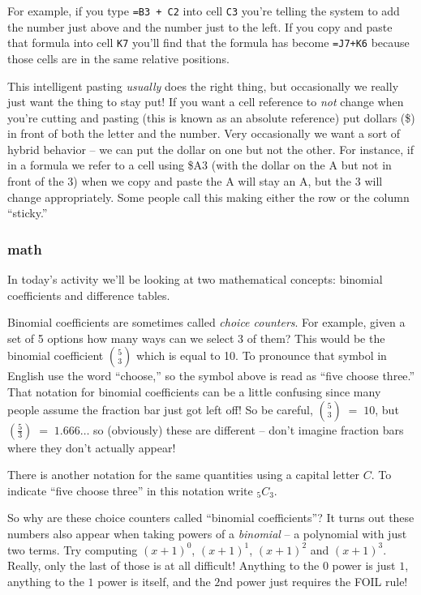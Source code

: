 For example, if you type {\tt =B3 + C2}  into cell {\tt C3} you're telling the system to add the number just above and the number just to the left.  If you copy and paste that formula into cell {\tt K7} you'll find that the formula has become {\tt =J7+K6} because those cells are in the same relative positions.

This intelligent pasting {\em usually} does the right thing, but occasionally we really just want the thing to stay put!  If you want a cell reference to {\em not} change when you're cutting and pasting (this is known as an absolute reference) put dollars (\$) in front of both the letter and the number.  Very occasionally we want a sort of hybrid behavior -- we can put the dollar on one but not the other.  For instance, if in a formula we refer to a cell using \$A3  (with the dollar on the A but not in front of the 3) when we copy and paste the A will stay an A, but the 3 will change appropriately.  Some people call this making either the row or the column ``sticky.''  

\subsubsection{math}

In today's activity we'll be looking at two mathematical concepts: binomial coefficients and difference tables.

Binomial coefficients are sometimes called {\em choice counters}.  For example, given a set of 5 options how many ways can we select 3 of them?  This would be the binomial coefficient $\binom{5}{3}$ which is equal to 10.  To pronounce that symbol in English use the word ``choose,''  so the symbol above is read as ``five choose three.''  That notation for binomial coefficients can be a little confusing since many people assume the fraction bar just got left off!  So be careful, $\binom{5}{3} \; = \; 10$, but $\left( \frac{5}{3} \right) \; = \; 1.666\ldots$  so (obviously) these are different -- don't imagine fraction bars where they don't actually appear!

There is another notation for the same quantities using a capital letter $C$.  To indicate ``five choose three'' in this notation write $_5C_3$.

So why are these choice counters called ``binomial coefficients''?   It turns out these numbers also appear when taking powers of a {\em binomial} -- a polynomial with just two terms.  Try computing $(x+1)^0$, $(x+1)^1$, $(x+1)^2$ and $(x+1)^3$.  Really, only the last of those is at all difficult!  Anything to the $0$ power is just $1$, anything to the $1$ power is itself, and the $2$nd power just requires the FOIL rule!

